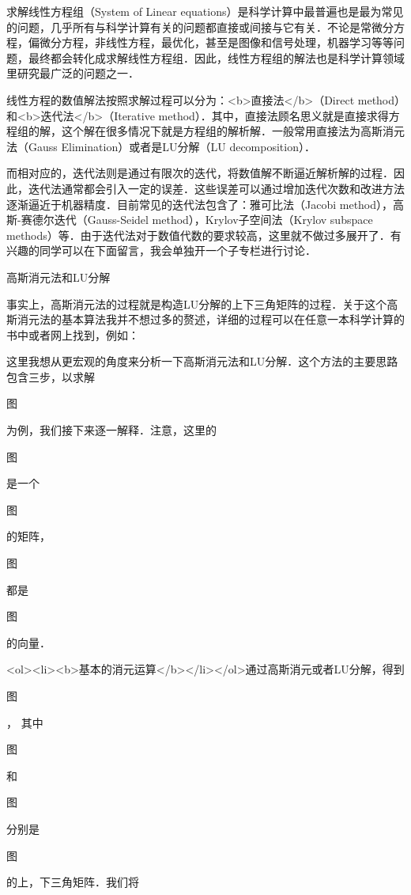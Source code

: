 
求解线性方程组（System of Linear equations）是科学计算中最普遍也是最为常见的问题，几乎所有与科学计算有关的问题都直接或间接与它有关．不论是常微分方程，偏微分方程，非线性方程，最优化，甚至是图像和信号处理，机器学习等等问题，最终都会转化成求解线性方程组．因此，线性方程组的解法也是科学计算领域里研究最广泛的问题之一．

线性方程的数值解法按照求解过程可以分为：<b>直接法</b>（Direct method）和<b>迭代法</b>（Iterative method）．其中，直接法顾名思义就是直接求得方程组的解，这个解在很多情况下就是方程组的解析解．一般常用直接法为高斯消元法（Gauss Elimination）或者是LU分解（LU decomposition）．

而相对应的，迭代法则是通过有限次的迭代，将数值解不断逼近解析解的过程．因此，迭代法通常都会引入一定的误差．这些误差可以通过增加迭代次数和改进方法逐渐逼近于机器精度．目前常见的迭代法包含了：雅可比法（Jacobi method），高斯-赛德尔迭代（Gauss-Seidel method），Krylov子空间法（Krylov subspace methods）等．由于迭代法对于数值代数的要求较高，这里就不做过多展开了．有兴趣的同学可以在下面留言，我会单独开一个子专栏进行讨论．

高斯消元法和LU分解

事实上，高斯消元法的过程就是构造LU分解的上下三角矩阵的过程．关于这个高斯消元法的基本算法我并不想过多的赘述，详细的过程可以在任意一本科学计算的书中或者网上找到，例如：



这里我想从更宏观的角度来分析一下高斯消元法和LU分解．这个方法的主要思路包含三步，以求解

图

 为例，我们接下来逐一解释．注意，这里的

图

  是一个

图

 的矩阵，

图

 都是

图

 的向量．

<ol><li><b>基本的消元运算</b></li></ol>通过高斯消元或者LU分解，得到

图

 ， 其中

图

 和

图

 分别是

图

 的上，下三角矩阵．我们将

